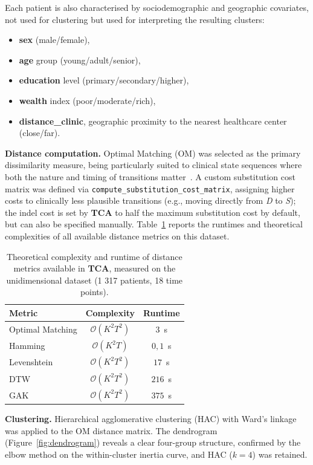 \documentclass[a4paper]{cas-sc}
\newcommand{\code}[1]{\texttt{#1}}
\newcommand{\pkg}[1]{\textbf{#1}}
\begin{document}
 
Each patient is also characterised by sociodemographic and geographic covariates, not used for clustering but used for interpreting the resulting clusters: 
\begin{itemize}
  \item \textbf{sex} (male/female), 
  \item \textbf{age} group (young/adult/senior), 
  \item \textbf{education} level (primary/secondary/higher), 
  \item \textbf{wealth} index (poor/moderate/rich), 
  \item \textbf{distance\_clinic}, geographic proximity to the nearest healthcare center (close/far).
\end{itemize}

\textbf{Distance computation.}
Optimal Matching (OM) was selected as the primary dissimilarity measure, being particularly suited to clinical state sequences where both the nature and timing of transitions matter~\cite{andjohn1986optimal}. 
A custom substitution cost matrix was defined via \code{compute\_substitution\_cost\_matrix}, assigning higher costs to clinically less plausible transitions (e.g., moving directly from \textit{D} to \textit{S}); the indel cost is set by \pkg{TCA} to half the maximum substitution cost by default, but can also be specified manually. 
Table~\ref{tab:runtimes} reports the runtimes and theoretical complexities of all available distance metrics on this dataset.
 
\begin{table}[h]
\centering
\caption{Theoretical complexity and runtime  of distance metrics available in \pkg{TCA}, measured on the unidimensional dataset (1 317 patients, 18 time points).}
\label{tab:runtimes}
\begin{tabular}{lcc}
\hline
\textbf{Metric} & \textbf{Complexity} & \textbf{Runtime} \\
\hline
Optimal Matching & $\mathcal{O}(K^2 T^2)$ & $3$~s \\
Hamming & $\mathcal{O}(K^2 T)$ &  $0,1$~s  \\
Levenshtein & $\mathcal{O}(K^2 T^2)$ & $17$~s \\
DTW & $\mathcal{O}(K^2 T^2)$ & $216$~s \\
GAK & $\mathcal{O}(K^2 T^2)$ & $375$~s \\
\hline
\end{tabular}
\end{table}

\textbf{Clustering.}
Hierarchical agglomerative clustering (HAC) with Ward's linkage was applied to the OM distance matrix. The dendrogram (Figure~\ref{fig:dendrogram}) reveals a clear four-group structure, confirmed by the elbow method on the within-cluster inertia curve, and HAC ($k=4$) was retained.
 
\end{document}
